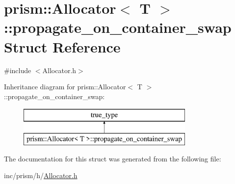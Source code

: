 \hypertarget{structprism_1_1_allocator_1_1propagate__on__container__swap}{}\section{prism\+:\+:Allocator$<$ T $>$\+:\+:propagate\+\_\+on\+\_\+container\+\_\+swap Struct Reference}
\label{structprism_1_1_allocator_1_1propagate__on__container__swap}


{\ttfamily \#include $<$Allocator.\+h$>$}

Inheritance diagram for prism\+:\+:Allocator$<$ T $>$\+:\+:propagate\+\_\+on\+\_\+container\+\_\+swap\+:\begin{figure}[H]
\begin{center}
\leavevmode
\includegraphics[height=2.000000cm]{structprism_1_1_allocator_1_1propagate__on__container__swap}
\end{center}
\end{figure}


The documentation for this struct was generated from the following file\+:\begin{DoxyCompactItemize}
\item 
inc/prism/h/\hyperlink{_allocator_8h}{Allocator.\+h}\end{DoxyCompactItemize}
